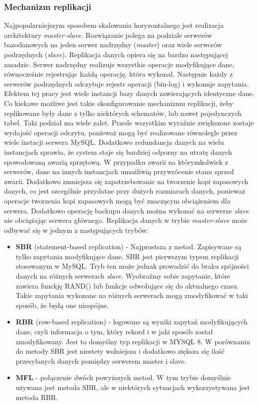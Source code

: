 \subsubsection{Mechanizm replikacji}
Najpopularniejszym sposobem skalowania horyzontalnego jest realizacja architektury \textit{master-slave}. Rozwiązanie polega na podziale serwerów bazodanowych na jeden serwer nadrzędny (\textit{master}) oraz wiele serwerów podrzędnych (\textit{slave}). Replikacja danych opiera się na bardzo następującej zasadzie. Serwer nadrzędny realizuje wszystkie operacje modyfikujące dane, równocześnie rejestrując każdą operację, która wykonał. Następnie każdy z serwerów podrzędnych odczytuje rejestr operacji (bin-log) i wykonuje zapytania. Efektem tej pracy jest wiele instancji bazy danych zawierających identyczne dane. Co kiekawe możliwe jest takie skonfigurowanie mechanizmu replikacji, żeby replikowane były dane z tylko niektórych schematów, lub nawet pojedynczych tabel.
Taki podział ma wiele zalet. Przede wszystkim wyraźnie zwiększone zostaje wydajość operacji odczytu, ponieważ mogą być realizowane równolegle przez wiele instacji serwera MySQL. Dodatkowo redundancja danych na wielu instancjach sprawia, że system staje się bardziej odporny na utratę danych spowodowaną awarią sprzętową. W przypadku awarii na którymkolwiek z serwerów, dane na innych instancjach umożliwią przywrócenie stanu sprzed awarii. Dodatkowo zmniejsza się zapotrzebowanie na tworzenie kopi zapasowych danych, co jest szcególnie przydatne przy dużych rozmiarach danych, ponieważ operacje tworzenia kopi zapasowych mogą być znaczącym obciążeniem dla serwera. Dodatkowo operację backupu danych można wykonać na serwerze \textit{slave} nie obciążając serwera głównego. Replikacja danych w trybie \textit{master-slave} może odbywać się w jednym z następujących trybów:
\begin{itemize}
 	\item \textbf{SBR} (statement-based replication) - Najprostsza z metod. Zapisywane są tylko zapytania modyfikujące dane. SBR jest pierwszym typem replikacji stosowanym w MySQL. Tryb ten może jednak prowadzić do braku spójności danych na różnych serwerach \textit{slave}. Wyobraźmy sobie zapytanie, które zawiera funckję RAND() lub funkcje odwołujące się do aktualnego czasu. Takie zapytania wykonane na różnych serwerach mogą zmodyfikować w taki sposób, że będą one niespójne.
	\item \textbf{RBR} (row-based replication) - logowane są wyniki zapytań modyfikujących dane, czyli informacja o tym, który rekord i w jaki sposób został zmodyfikowany. Jest to domyślny typ replikacji w MYSQL 8. W porównaniu do metody SBR jest niestety wolniejsza i dodatkowo ziększa się ilość przesyłanych danych pomiędzy serwerem master i slave.
	\item \textbf{MFL} - połączenie dwóch powyższych metod. W tym trybie domyślnie używana jest metoda SBR, ale w niektórych sytuacjach wykorzystywana jest metoda RBR.
\end{itemize}

